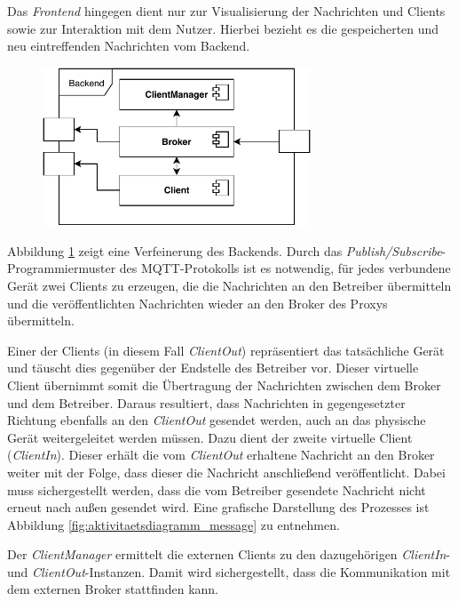     Das \emph{Frontend} hingegen dient nur zur Visualisierung der Nachrichten und Clients sowie zur Interaktion mit dem Nutzer. Hierbei bezieht es die gespeicherten und neu eintreffenden Nachrichten vom Backend.

    \begin{figure}[h]%
        \centering
        \includegraphics[width=8cm]{tex/bilder/4_konzept/Systemdiagramm_Konzept_Backend.pdf}
        \label{fig:system_backend}
    \end{figure}
    
    Abbildung \ref{fig:system_backend} zeigt eine Verfeinerung des Backends. 
    Durch das \emph{Publish/Subscribe}-Programmiermuster des \ac{MQTT}-Protokolls ist es notwendig, für jedes verbundene Gerät zwei Clients zu erzeugen, die die Nachrichten an den Betreiber übermitteln und die veröffentlichten Nachrichten wieder an den Broker des Proxys übermitteln.
    
    Einer der Clients (in diesem Fall \emph{ClientOut}) repräsentiert das tatsächliche Gerät und täuscht dies gegenüber der Endstelle des Betreiber vor. Dieser virtuelle Client übernimmt somit die Übertragung der Nachrichten zwischen dem Broker und dem Betreiber. Daraus resultiert, dass Nachrichten in gegengesetzter Richtung ebenfalls an den \emph{ClientOut} gesendet werden, auch an das physische Gerät weitergeleitet werden müssen. Dazu dient der zweite virtuelle Client (\emph{ClientIn}). Dieser erhält die vom \emph{ClientOut} erhaltene Nachricht an den Broker weiter mit der Folge, dass dieser die Nachricht anschließend veröffentlicht. Dabei muss sichergestellt werden, dass die vom Betreiber gesendete Nachricht nicht erneut nach außen gesendet wird.
    Eine grafische Darstellung des Prozesses ist Abbildung \ref{fig:aktivitaetsdiagramm_message} zu entnehmen.
    
    Der \emph{ClientManager} ermittelt die externen Clients zu den dazugehörigen \emph{ClientIn}- und \emph{ClientOut}-Instanzen. Damit wird sichergestellt, dass die Kommunikation mit dem externen Broker stattfinden kann.

